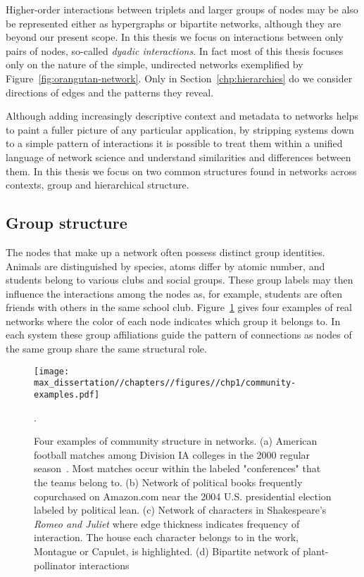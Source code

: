 Higher-order interactions between triplets and larger groups of nodes may be also be represented either as hypergraphs or bipartite networks, although they are beyond our present scope. In this thesis we focus on interactions between only pairs of nodes, so-called \emph{dyadic interactions}. In fact most of this thesis focuses only on the nature of the simple, undirected networks exemplified by Figure~\ref{fig:orangutan-network}. Only in Section~\ref{chp:hierarchies} do we consider directions of edges and the patterns they reveal. 

Although adding increasingly descriptive context and metadata to networks helps to paint a fuller picture of any particular application, by stripping systems down to a simple pattern of interactions it is possible to treat them within a unified language of network science and understand similarities and differences between them. In this thesis we focus on two common structures found in networks across contexts, group and hierarchical structure. 

\subsection{Group structure}
\label{sec:group-structure}
The nodes that make up a network often possess distinct group identities. Animals are distinguished by species, atoms differ by atomic number, and students belong to various clubs and social groups. These group labels may then influence the interactions among the nodes as, for example, students are often friends with others in the same school club. Figure~\ref{fig:community-examples} gives four examples of real networks where the color of each node indicates which group it belongs to. In each system these group affiliations guide the pattern of connections as nodes of the same group share the same structural role.

\begin{figure}
    \centering
    \texttt{[image: max\_dissertation//chapters//figures//chp1/community-examples.pdf]}
    \caption{Four examples of community structure in networks. (a) American football matches among Division IA colleges in the 2000 regular season~\cite{GN02}. Most matches occur within the labeled "conferences" that the teams belong to. (b) Network of political books frequently copurchased on Amazon.com near the 2004 U.S. presidential election labeled by political lean. (c) Network of characters in Shakespeare's \textit{Romeo and Juliet} where edge thickness indicates frequency of interaction. The house each character belongs to in the work, Montague or Capulet, is highlighted. (d) Bipartite network of plant-pollinator interactions~\cite{BMM09}}.
    \label{fig:community-examples}
\end{figure}

